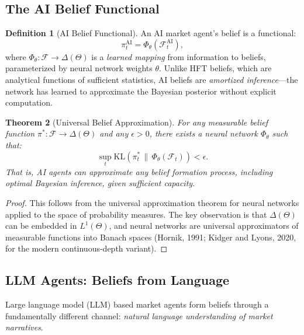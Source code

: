 \documentclass[12pt,a4paper]{article}
\newtheorem{theorem}{Theorem}[section]
\theoremstyle{definition}
\newtheorem{definition}[theorem]{Definition}
\newcommand{\F}{\mathcal{F}}
\newcommand{\KL}{\mathrm{KL}}
\begin{document}
\subsection{The AI Belief Functional}

\begin{definition}[AI Belief Functional]\label{def:ai-belief-functional}
An AI market agent's belief is a functional:
\begin{equation}\label{eq:ai-belief}
  \pi_t^{\mathrm{AI}} = \Phi_\theta\left(\F_t^{\mathrm{AI}}\right),
\end{equation}
where $\Phi_\theta: \mathcal{F} \to \Delta(\Theta)$ is a \emph{learned mapping} from information to beliefs, parameterized by neural network weights $\theta$. Unlike HFT beliefs, which are analytical functions of sufficient statistics, AI beliefs are \emph{amortized inference}---the network has learned to approximate the Bayesian posterior without explicit computation.
\end{definition}

\begin{theorem}[Universal Belief Approximation]\label{thm:universal-belief}
For any measurable belief function $\pi^*: \F \to \Delta(\Theta)$ and any $\epsilon > 0$, there exists a neural network $\Phi_\theta$ such that:
\begin{equation}
  \sup_{t} \KL\left(\pi_t^* \,\|\, \Phi_\theta(\F_t)\right) < \epsilon.
\end{equation}
That is, AI agents can approximate \emph{any} belief formation process, including optimal Bayesian inference, given sufficient capacity.
\end{theorem}

\begin{proof}
This follows from the universal approximation theorem for neural networks applied to the space of probability measures. The key observation is that $\Delta(\Theta)$ can be embedded in $L^1(\Theta)$, and neural networks are universal approximators of measurable functions into Banach spaces (Hornik, 1991; Kidger and Lyons, 2020, for the modern continuous-depth variant).
\end{proof}

\subsection{LLM Agents: Beliefs from Language}

Large language model (LLM) based market agents form beliefs through a fundamentally different channel: \emph{natural language understanding of market narratives}.
\end{document}
